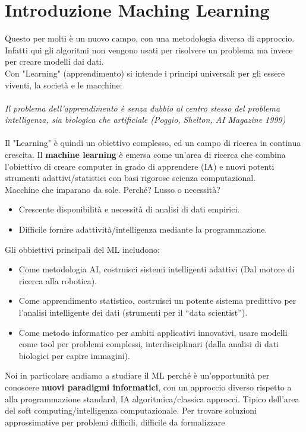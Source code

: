 \newpage
\section{Introduzione Maching Learning}
Questo per molti è un nuovo campo, con una metodologia diversa di approccio. Infatti qui gli algoritmi non vengono usati
per risolvere un problema ma invece per creare modelli dai dati.\\
Con "Learning" (apprendimento) si intende i principi universali per gli essere viventi, la società e le macchine:\\\\
\textit{Il problema dell’apprendimento è senza dubbio al centro stesso del problema intelligenza, sia biologica che artificiale (Poggio, Shelton, AI Magazine 1999)}\\\\
Il "Learning" è quindi un obiettivo complesso, ed un campo di ricerca in continua crescita.
Il \textbf{machine learning} è emersa come un’area di ricerca che combina l'obiettivo di creare computer in grado di apprendere (IA) e nuovi potenti strumenti adattivi/statistici con basi rigorose scienza computazional.\\
Macchine che imparano da sole. Perché? Lusso o necessità?
\begin{itemize}
    \item Crescente disponibilità e necessità di analisi di dati empirici.
    \item Difficile fornire adattività/intelligenza mediante la programmazione.
\end{itemize}
Gli obbiettivi principali del ML includono:
\begin{itemize}
    \item Come metodologia AI, costruisci sistemi intelligenti adattivi (Dal motore di ricerca alla robotica).
    \item Come apprendimento statistico, costruisci un potente sistema predittivo per l'analisi intelligente dei dati (strumenti per il “data scientist”).
    \item Come metodo informatico per ambiti applicativi innovativi, usare modelli come tool per problemi complessi, interdisciplinari (dalla analisi di dati biologici per capire immagini).
\end{itemize}
Noi in particolare andiamo a studiare il ML perché è un'opportunità per conoscere \textbf{nuovi paradigmi informatici}, con un approccio diverso rispetto a alla programmazione standard, IA algoritmica/classica approcci. 
Tipico dell'area del soft computing/intelligenza computazionale. Per trovare soluzioni approssimative per problemi difficili, difficile da formalizzare
